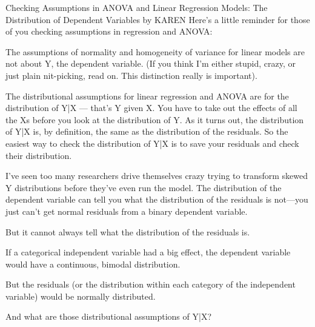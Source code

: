 Checking Assumptions in ANOVA and Linear Regression Models: The Distribution of Dependent Variables
by KAREN
Here’s a little reminder for those of you checking assumptions in regression and ANOVA:

The assumptions of normality and homogeneity of variance for linear models are not about Y, the dependent variable.  
(If you think I’m either stupid, crazy, or just plain nit-picking, read on.  This distinction really is important).

The distributional assumptions for linear regression and ANOVA are for the distribution of Y|X — that’s Y given X.  You have to take out the effects of all the Xs before you look at the distribution of Y.  As it turns out, the distribution of Y|X is, by definition, the same as the distribution of the residuals.  So the easiest way to check the distribution of Y|X is to save your residuals and check their distribution.

I’ve seen too many researchers drive themselves crazy trying to transform skewed Y distributions before they’ve even run the model.  The distribution of the dependent variable can tell you what the distribution of the residuals is not—you just can’t get normal residuals from a binary dependent variable.

But it cannot always tell what the distribution of the residuals is.

If a categorical independent variable had a big effect, the dependent variable would have a continuous, bimodal distribution.  

But the residuals (or the distribution within each category of the independent variable) would be normally distributed.

And what are those distributional assumptions of Y|X?


